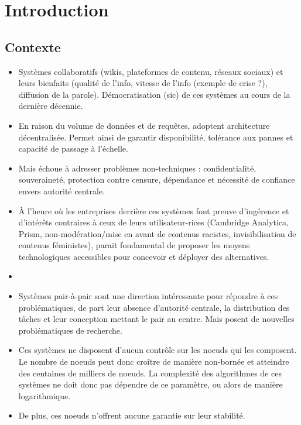 \documentclass[12pt]{thesul}
\begin{document}
\DontWriteThisInToc
\listoffigures

\mainmatter
\NumberThisInToc
\chapter*{Introduction}
\minitoc
\section{Contexte}

\begin{itemize}
  \item Systèmes collaboratifs (wikis, plateformes de contenu, réseaux sociaux) et leurs bienfaits (qualité de l'info, vitesse de l'info (exemple de crise ?), diffusion de la parole).
    Démocratisation (sic) de ces systèmes au cours de la dernière décennie.
  \item En raison du volume de données et de requêtes, adoptent architecture décentralisée.
    Permet ainsi de garantir disponibilité, tolérance aux pannes et capacité de passage à l'échelle.
  \item Mais échoue à adresser problèmes non-techniques : confidentialité, souveraineté, protection contre censure, dépendance et nécessité de confiance envers autorité centrale.
  \item À l'heure où les entreprises derrière ces systèmes font preuve d'ingérence et d'intérêts contraires à ceux de leurs utilisateur-rices (Cambridge Analytica, Prism, non-modération/mise en avant de contenus racistes, invisibilisation de contenus féministes), parait fondamental de proposer les moyens technologiques accessibles pour concevoir et déployer des alternatives.
  \item {}
  \item Systèmes pair-à-pair sont une direction intéressante pour répondre à ces problématiques, de part leur absence d'autorité centrale, la distribution des tâches et leur conception mettant le pair au centre.
    Mais posent de nouvelles problématiques de recherche.
  \item Ces systèmes ne disposent d'aucun contrôle sur les noeuds qui les composent.
    Le nombre de noeuds peut donc croître de manière non-bornée et atteindre des centaines de milliers de noeuds.
    La complexité des algorithmes de ces systèmes ne doit donc pas dépendre de ce paramètre, ou alors de manière logarithmique.
  \item De plus, ces noeuds n'offrent aucune garantie sur leur stabilité.

\end{itemize}
\end{document}
